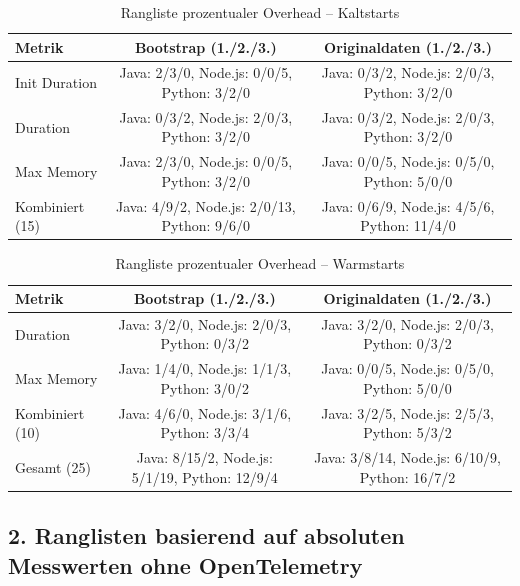 \begin{table}[H]
\centering
\footnotesize
\setlength{\tabcolsep}{4pt}
\caption{Rangliste prozentualer Overhead – Kaltstarts}
\label{app:ranking-overhead-cold}
\begin{tabular}{|l|cc|}
\hline
\textbf{Metrik} & \textbf{Bootstrap (1./2./3.)} & \textbf{Originaldaten (1./2./3.)} \\
\hline
Init Duration & Java: 2/3/0, Node.js: 0/0/5, Python: 3/2/0 & Java: 0/3/2, Node.js: 2/0/3, Python: 3/2/0 \\
\hline
Duration      & Java: 0/3/2, Node.js: 2/0/3, Python: 3/2/0 & Java: 0/3/2, Node.js: 2/0/3, Python: 3/2/0 \\
\hline
Max Memory    & Java: 2/3/0, Node.js: 0/0/5, Python: 3/2/0 & Java: 0/0/5, Node.js: 0/5/0, Python: 5/0/0 \\
\hline
Kombiniert (15) & Java: 4/9/2, Node.js: 2/0/13, Python: 9/6/0 & Java: 0/6/9, Node.js: 4/5/6, Python: 11/4/0 \\
\hline
\end{tabular}
\end{table}

\begin{table}[H]
\centering
\footnotesize
\setlength{\tabcolsep}{4pt}
\caption{Rangliste prozentualer Overhead – Warmstarts}
\label{app:ranking-overhead-warm}
\begin{tabular}{|l|cc|}
\hline
\textbf{Metrik} & \textbf{Bootstrap (1./2./3.)} & \textbf{Originaldaten (1./2./3.)} \\
\hline
Duration      & Java: 3/2/0, Node.js: 2/0/3, Python: 0/3/2 & Java: 3/2/0, Node.js: 2/0/3, Python: 0/3/2 \\
\hline
Max Memory    & Java: 1/4/0, Node.js: 1/1/3, Python: 3/0/2 & Java: 0/0/5, Node.js: 0/5/0, Python: 5/0/0 \\
\hline
Kombiniert (10) & Java: 4/6/0, Node.js: 3/1/6, Python: 3/3/4 & Java: 3/2/5, Node.js: 2/5/3, Python: 5/3/2 \\
\hline
Gesamt (25)   & Java: 8/15/2, Node.js: 5/1/19, Python: 12/9/4 & Java: 3/8/14, Node.js: 6/10/9, Python: 16/7/2 \\
\hline
\end{tabular}
\end{table}

\subsection*{2. Ranglisten basierend auf absoluten Messwerten ohne OpenTelemetry}

